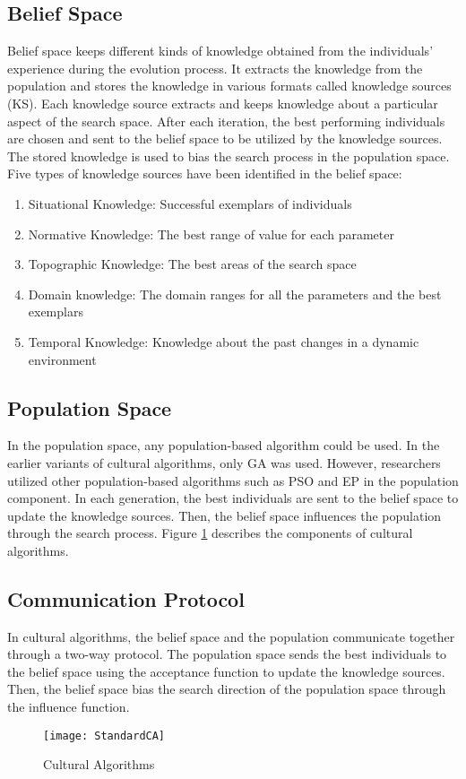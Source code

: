 \subsection{Belief Space}
Belief space keeps different kinds of knowledge obtained from the individuals' experience during the evolution process. It extracts the knowledge from the population and stores the knowledge in various formats called knowledge sources (KS). Each knowledge source extracts and keeps knowledge about a particular aspect of the search space. 
\newline
After each iteration, the best performing individuals are chosen and sent to the belief space to be utilized by the knowledge sources. The stored knowledge is used to bias the search process in the population space. Five types of knowledge sources have been identified in the belief space:
\begin{enumerate}
	\item Situational Knowledge: Successful exemplars of individuals
	\item Normative Knowledge: The best range of value for each parameter
	\item Topographic Knowledge: The best areas of the search space
	\item Domain knowledge: The domain ranges for all the parameters and the best exemplars
	\item Temporal Knowledge: Knowledge about the past changes in a dynamic environment
\end{enumerate}
\subsection{Population Space}
In the population space, any population-based algorithm could be used. In the earlier variants of cultural algorithms, only GA was used. However, researchers utilized other population-based algorithms such as PSO and EP in the population component. In each generation, the best individuals are sent to the belief space to update the knowledge sources. Then, the belief space influences the population through the search process. Figure \ref{fig:StandardCA} describes the components of cultural algorithms.
\subsection{Communication Protocol}
In cultural algorithms, the belief space and the population communicate together through a two-way protocol. The population space sends the best individuals to the belief space using the acceptance function to update the knowledge sources. Then, the belief space bias the search direction of the population space through the influence function.
\begin{figure}[h]
	\texttt{[image: StandardCA]}
	\centering
	\caption{Cultural Algorithms \cite{kobti2013heterogeneous}}
	\label{fig:StandardCA}
\end{figure}
